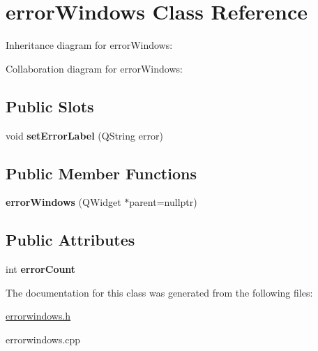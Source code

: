 \hypertarget{classerrorWindows}{}\section{error\+Windows Class Reference}
\label{classerrorWindows}


Inheritance diagram for error\+Windows\+:


Collaboration diagram for error\+Windows\+:
\subsection*{Public Slots}
\begin{DoxyCompactItemize}
\item 
\mbox{\label{classerrorWindows_a43f3e939396bdeac8d32d88fdfb9439f}} 
void {\bfseries set\+Error\+Label} (Q\+String error)
\end{DoxyCompactItemize}
\subsection*{Public Member Functions}
\begin{DoxyCompactItemize}
\item 
\mbox{\label{classerrorWindows_a3be50560142be57725c252ba7709eb46}} 
{\bfseries error\+Windows} (Q\+Widget $\ast$parent=nullptr)
\end{DoxyCompactItemize}
\subsection*{Public Attributes}
\begin{DoxyCompactItemize}
\item 
\mbox{\label{classerrorWindows_a5dd7af37e8627af724a56364a2ed867b}} 
int {\bfseries error\+Count}
\end{DoxyCompactItemize}


The documentation for this class was generated from the following files\+:\begin{DoxyCompactItemize}
\item 
\hyperlink{errorwindows_8h}{errorwindows.\+h}\item 
errorwindows.\+cpp\end{DoxyCompactItemize}
